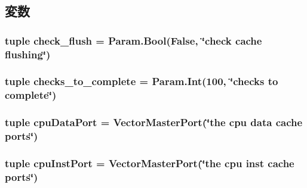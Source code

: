 \subsection{変数}
\hypertarget{classRubyTester_1_1RubyTester_a400ee54e1eb918acf9125089d511859c}{
\subsubsection[{check\_\-flush}]{\setlength{\rightskip}{0pt plus 5cm}tuple {\bf check\_\-flush} = Param.Bool(False, \char`\"{}check cache flushing\char`\"{})}}
\label{classRubyTester_1_1RubyTester_a400ee54e1eb918acf9125089d511859c}
\hypertarget{classRubyTester_1_1RubyTester_a994a51defc7253aced0a10ea476ec95e}{
\subsubsection[{checks\_\-to\_\-complete}]{\setlength{\rightskip}{0pt plus 5cm}tuple {\bf checks\_\-to\_\-complete} = Param.Int(100, \char`\"{}checks to complete\char`\"{})}}
\label{classRubyTester_1_1RubyTester_a994a51defc7253aced0a10ea476ec95e}
\hypertarget{classRubyTester_1_1RubyTester_a70fb37d74d11e7e7c36433c9ca029bea}{
\subsubsection[{cpuDataPort}]{\setlength{\rightskip}{0pt plus 5cm}tuple {\bf cpuDataPort} = VectorMasterPort(\char`\"{}the cpu data cache ports\char`\"{})}}
\label{classRubyTester_1_1RubyTester_a70fb37d74d11e7e7c36433c9ca029bea}
\hypertarget{classRubyTester_1_1RubyTester_ab3e342922861f8da4d310967fdbfbd72}{
\subsubsection[{cpuInstPort}]{\setlength{\rightskip}{0pt plus 5cm}tuple {\bf cpuInstPort} = VectorMasterPort(\char`\"{}the cpu inst cache ports\char`\"{})}}
